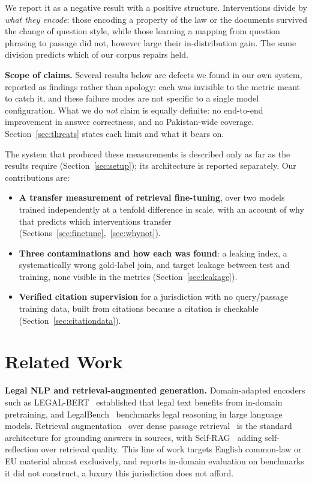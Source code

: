\documentclass[conference]{IEEEtran}
\begin{document}
We report it as a negative result with a positive structure. Interventions
divide by \emph{what they encode}: those encoding a property of the law or the
documents survived the change of question style, while those learning a mapping
from question phrasing to passage did not, however large their in-distribution
gain. The same division predicts which of our corpus repairs held.

\textbf{Scope of claims.} Several results below are defects we found in our own
system, reported as findings rather than apology: each was invisible to the
metric meant to catch it, and these failure modes are not specific to a single
model configuration. What we do \emph{not} claim is equally definite: no
end-to-end improvement in answer correctness, and no Pakistan-wide coverage.
Section~\ref{sec:threats} states each limit and what it bears on.

The system that produced these measurements is described only as far as the
results require (Section~\ref{sec:setup}); its architecture is reported
separately. Our contributions are:

\begin{itemize}
\item \textbf{A transfer measurement of retrieval fine-tuning}, over two models
trained independently at a tenfold difference in scale, with an account of why
that predicts which interventions transfer
(Sections~\ref{sec:finetune},~\ref{sec:whynot}).
\item \textbf{Three contaminations and how each was found}: a leaking index, a
systematically wrong gold-label join, and target leakage between test and
training, none visible in the metrics (Section~\ref{sec:leakage}).
\item \textbf{Verified citation supervision} for a jurisdiction with no
query/passage training data, built from citations because a citation is
checkable (Section~\ref{sec:citationdata}).
\end{itemize}

\section{Related Work}
\textbf{Legal NLP and retrieval-augmented generation.}
Domain-adapted encoders such as LEGAL-BERT~\cite{chalkidis2020legalbert}
established that legal text benefits from in-domain pretraining, and
LegalBench~\cite{guha2023legalbench} benchmarks legal reasoning in large
language models. Retrieval augmentation~\cite{lewis2020rag} over dense
passage retrieval~\cite{karpukhin2020dpr} is the standard architecture for
grounding answers in sources, with Self-RAG~\cite{asai2024selfrag} adding
self-reflection over retrieval quality. This line of work targets English
common-law or EU material almost exclusively, and reports in-domain evaluation
on benchmarks it did not construct, a luxury this jurisdiction does not
afford.
\end{document}
